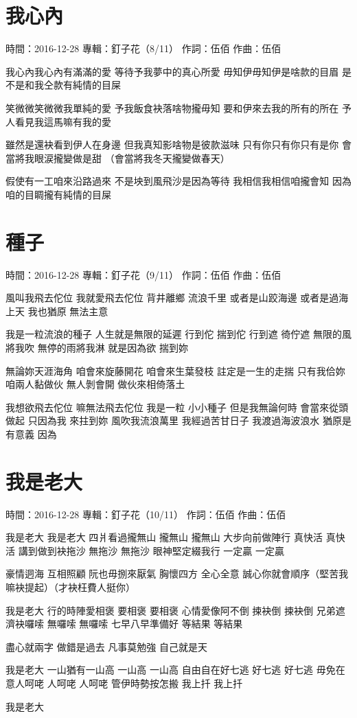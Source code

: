 \documentclass[UTF8,a4paper,oneside,twocolumn,12pt]{ctexbook}
\newcommand{\infopair}[2]{\textbullet #1：#2}
\newcommand{\zc}[1][伍佰]{\infopair{作詞}{#1}}
\newcommand{\zq}[1][伍佰]{\infopair{作曲}{#1}}
\newcommand{\zj}[1]{\infopair{專輯}{#1}}
\newcommand{\sj}[1]{\infopair{時間}{#1}}
\newenvironment{info}{\begin{flushleft}\kaishu
	}
	{\end{flushleft}\normalsize\yahei\par}
\newenvironment{lyric}{
	}
{}
\begin{document}
\section{我心內}
\begin{info}
	\sj{2016-12-28}
	\zj{釘子花（8/11）}
	\zc
	\zq
\end{info}
\begin{lyric}
	我心內我心內有滿滿的愛
	等待予我夢中的真心所愛
	毋知伊毋知伊是啥款的目眉
	是不是和我仝款有純情的目屎

	笑微微笑微微我單純的愛
	予我飯食袂落啥物攏毋知
	要和伊來去我的所有的所在
	予人看見我這馬嘛有我的愛

	雖然是還袂看到伊人在身邊
	但我真知影啥物是彼款滋味
	只有你只有你只有是你
	會當將我眼涙攏變做是甜
	（會當將我冬天攏變做春天）

	假使有一工咱來沿路過來
	不是坱到風飛沙是因為等待
	我相信我相信咱攏會知
	因為咱的目睭攏有純情的目屎
\end{lyric}

\section{種子}
\begin{info}
	\sj{2016-12-28}
	\zj{釘子花（9/11）}
	\zc
	\zq
\end{info}
\begin{lyric}
	風叫我飛去佗位 我就愛飛去佗位
	背井離鄉 流浪千里
	或者是山跤海邊 或者是過海上天
	我也猶原 無法主意

	我是一粒流浪的種子 人生就是無限的延遲
	行到佗 揣到佗 行到遮 徛佇遮
	無限的風將我吹 無停的雨將我淋
	就是因為欲 揣到妳

	無論妳天涯海角
	咱會來旋藤開花 咱會來生葉發枝
	註定是一生的走揣
	只有我佮妳 咱兩人黏做伙 無人剝會開
	做伙來相倚落土

	我想欲飛去佗位 嘛無法飛去佗位
	我是一粒 小小種子
	但是我無論何時 會當來從頭做起
	只因為我 來拄到妳
	風吹我流浪萬里
	我經過苦甘日子 我渡過海波浪水
	猶原是有意義 因為
\end{lyric}

\section{我是老大}
\begin{info}
	\sj{2016-12-28}
	\zj{釘子花（10/11）}
	\zc
	\zq
\end{info}
\begin{lyric}
	我是老大 我是老大
	四爿看過攏無山 攏無山 攏無山
	大步向前做陣行 真快活 真快活
	講到做到袂拖沙 無拖沙 無拖沙
	眼神堅定綴我行 一定贏 一定贏

	豪情迵海 互相照顧
	阮也毋捌來厭氣
	胸懷四方 全心全意
	誠心你就會順序（堅苦我嘛袂提起）（才袂枉費人挺你）

	我是老大
	行的時陣愛相褒 要相褒 要相褒
	心情愛像阿不倒 捒袂倒 捒袂倒
	兄弟遮濟袂囉嗦 無囉嗦 無囉嗦
	七早八早準備好 等結果 等結果

	盡心就兩字 做錯是過去
	凡事莫勉強 自己就是天

	我是老大
	一山猶有一山高 一山高 一山高
	自由自在好七逃 好七逃 好七逃
	毋免在意人呵咾 人呵咾 人呵咾
	管伊時勢按怎搬 我上扦 我上扦

	我是老大
\end{lyric}
\end{document}
